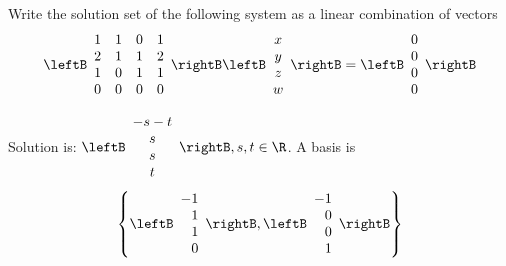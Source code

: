 \begin{enumialphparenastyle}
\begin{ex} \label{exerlineartransf7}Write the solution set of the following system as a linear combination of vectors
\begin{equation*}
\leftB
\begin{array}{rrrr}
1 & 1 & 0 & 1 \\
2 & 1 & 1 & 2 \\
1 & 0 & 1 & 1 \\
0 & 0 & 0 & 0
\end{array}
\rightB \leftB
\begin{array}{c}
x \\
y \\
z \\
w
\end{array}
\rightB =\leftB
\begin{array}{r}
0 \\
0 \\
0 \\
0
\end{array}
\rightB 
\end{equation*}
\begin{sol}
Solution is: $\leftB
\begin{array}{c}
-s-t \\
s \\
s \\
t
\end{array}
\rightB ,s,t\in \R$. A basis is
\[
\left\{ \leftB
\begin{array}{r}
-1 \\
1 \\
1 \\
0
\end{array}
\rightB ,\leftB
\begin{array}{r}
-1 \\
0 \\
0 \\
1
\end{array}
\rightB \right\}
\]
\end{sol}
\end{ex}



\end{enumialphparenastyle}
